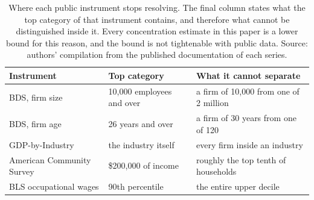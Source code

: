 \begin{table}[H]
\caption{Where each public instrument stops resolving. The final column states what the
top category of that instrument contains, and therefore what cannot be distinguished
inside it. Every concentration estimate in this paper is a lower bound for this reason, and
the bound is not tightenable with public data. Source: authors' compilation from the
published documentation of each series.}
\label{tab:censoring}
\begin{tabular}{lll}
\toprule
Instrument & Top category & What it cannot separate \\
\midrule
BDS, firm size & 10{,}000 employees and over & a firm of 10{,}000 from one of 2 million \\
BDS, firm age & 26 years and over & a firm of 30 years from one of 120 \\
GDP-by-Industry & the industry itself & every firm inside an industry \\
American Community Survey & \$200{,}000 of income & roughly the top tenth of households \\
BLS occupational wages & 90th percentile & the entire upper decile \\
\bottomrule
\end{tabular}
\end{table}
